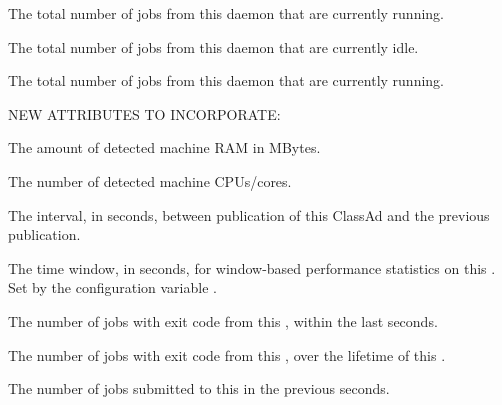 \begin{description}
\item[\AdAttr{TotalRunningJobs}:] The total number of jobs from this
   daemon that are currently running.

\item[\AdAttr{TotalSchedulerIdleJobs}:] The total number of 
    jobs from this
   daemon that are currently idle.

\item[\AdAttr{TotalSchedulerRunningJobs}:] The total number of 
    jobs from this
   daemon that are currently running.

NEW ATTRIBUTES TO INCORPORATE:

\item[\AdAttr{DetectedMemory}:] The amount of detected machine RAM in MBytes.

\item[\AdAttr{DetectedCpus}:] The number of detected machine CPUs/cores.

\item[\AdAttr{UpdateInterval}:] The interval, in seconds,
  between publication of this  ClassAd and
  the previous publication.

\item[\AdAttr{WindowedStatWidth}:] The time window, in seconds,
  for window-based performance statistics on this .
  Set by the configuration variable .

\item[\AdAttr{ExitCode<N>}:] The number of jobs with exit code
   from this ,
   within the last  seconds.

\item[\AdAttr{ExitCodeCumulative<N>}:] The number of jobs with exit 
  code  from this , over the lifetime of this
  .

\item[\AdAttr{JobsSubmitted}:] The number of jobs submitted to
  this  in the previous  seconds.


\end{description}
